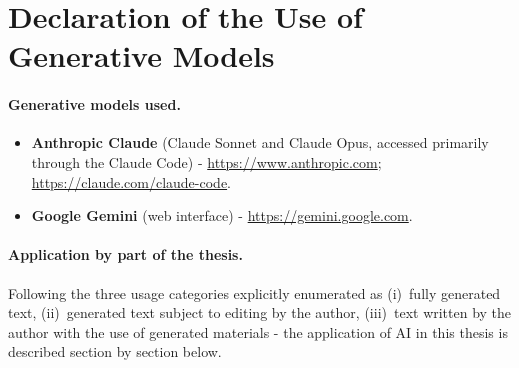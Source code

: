 \documentclass[a4paper, 12pt]{article}
\begin{document}
{\singlespacing
\tableofcontents
}
\clearpage


\section{Declaration of the Use of Generative Models}

\paragraph{Generative models used.}
\begin{itemize}
    \item \textbf{Anthropic Claude} (Claude Sonnet and Claude Opus, accessed primarily through the Claude Code) - \url{https://www.anthropic.com}; \url{https://claude.com/claude-code}.
    \item \textbf{Google Gemini} (web interface) - \url{https://gemini.google.com}.
\end{itemize}

\paragraph{Application by part of the thesis.}
Following the three usage categories explicitly enumerated as (i)~fully generated text, (ii)~generated text subject to editing by the author, (iii)~text written by the author with the use of generated materials - the application of AI in this thesis is described section by section below.
\end{document}
